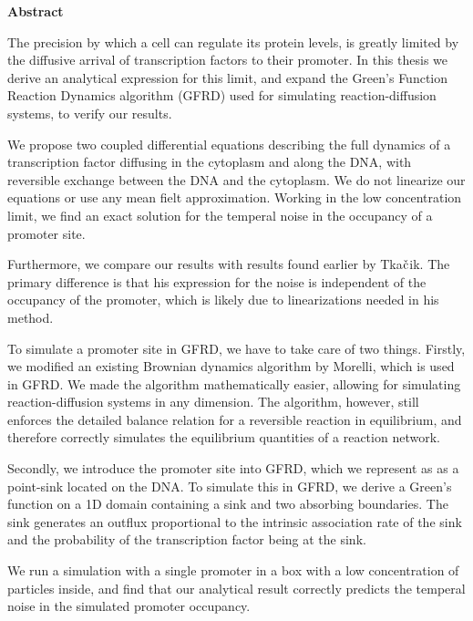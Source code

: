 \begin{center}
{\center \bf Abstract}
\end{center}

The precision by which a cell can regulate its protein levels, is greatly limited by the diffusive arrival of transcription factors to their promoter. In this thesis we derive an analytical expression for this limit, and expand the Green's Function Reaction Dynamics algorithm (GFRD) used for simulating reaction-diffusion systems, to verify our results.

We propose two coupled differential equations describing the full dynamics of a transcription factor diffusing in the cytoplasm and along the DNA, with reversible exchange between the DNA and the cytoplasm. We do not linearize our equations or use any mean fielt approximation. Working in the low concentration limit, we find an exact solution for the temperal noise in the occupancy of a promoter site. 

Furthermore, we compare our results with results found earlier by Tka$\check{\rm c}$ik. The primary difference is that his expression for the noise is independent of the occupancy of the promoter, which is likely due to linearizations needed in his method.

To simulate a promoter site in GFRD, we have to take care of two things. Firstly, we modified an existing Brownian dynamics algorithm by Morelli, which is used in GFRD. We made the algorithm mathematically easier, allowing for simulating reaction-diffusion systems in any dimension. The algorithm, however, still enforces the detailed balance relation for a reversible reaction in equilibrium, and therefore correctly simulates the equilibrium quantities of a reaction network. 

Secondly, we introduce the promoter site into GFRD, which we represent as as a point-sink located on the DNA. To simulate this in GFRD, we derive a Green's function on a 1D domain containing a sink and two absorbing boundaries. The sink generates an outflux proportional to the intrinsic association rate of the sink and the probability of the transcription factor being at the sink. 

We run a simulation with a single promoter in a box with a low concentration of particles inside, and find that our analytical result correctly predicts the temperal noise in the simulated promoter occupancy.


